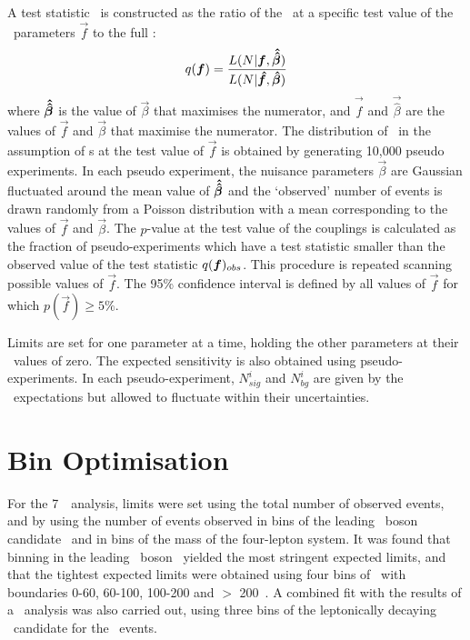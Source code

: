 A test statistic \teststat\ is constructed as the ratio of the \maxprofilellh\
at a specific test value of the \TGC\ parameters $\vec{f}$ to the full \maxprofilellh:
\begin{equation}
q(\boldsymbol{f}) =
\frac{L(N|\boldsymbol{f},\boldsymbol{\hat{\hat{\beta}}})}{L(N|\boldsymbol{\hat{f}},\boldsymbol{\hat{\beta}})}
\end{equation}
where $\boldsymbol{\hat{\hat{\beta}}}$ is the value of $\vec{\beta}$ that maximises the
numerator, and $\vec{\hat{f}}$ and $\vec{\hat{\beta}}$ are the values of
$\vec{f}$ and $\vec{\beta}$ that maximise the numerator. The distribution of
\teststat\ in the assumption of \TGC s at the test value of $\vec{f}$
is obtained by generating 10,000 pseudo experiments. In each
pseudo experiment, the nuisance parameters $\vec{\beta}$ are Gaussian
fluctuated around the mean value of $\boldsymbol{\hat{\hat{\beta}}}$ and the `observed' number of events
is drawn randomly from a Poisson distribution with a mean corresponding to the
values of $\vec{f}$ and $\vec{\beta}$. The $p$-value at the test value of the
couplings is calculated as the fraction of pseudo-experiments which have a test
statistic smaller than the observed value of the test statistic $q(\boldsymbol{f})_{obs}$.
This procedure is repeated scanning possible values of $\vec{f}$. The 95\%
confidence interval is defined by all values of $\vec{f}$ for which
$p(\vec{f})\geq 5\%$. 

Limits are set for one parameter at a time, holding the other parameters at
their \sm\ values of zero. The expected sensitivity is also obtained using
pseudo-experiments. In each pseudo-experiment, $N^{i}_{sig}$ and $N^{i}_{bg}$
are given by the \sm\ expectations but allowed to fluctuate within their
uncertainties.

\section{Bin Optimisation}
\label{sec:TGC-BinOpt}

For the 7~\tev\ analysis, limits were set using the total number of observed
events, and by using the number of events observed in bins of the leading \Z\
boson candidate \pt\ and in bins of the mass of the four-lepton system. It was found that
binning in the leading \Z\ boson \pt\ yielded the most stringent expected limits, and
that the tightest expected limits were obtained using four bins of \pt\ with boundaries 0-60,
60-100, 100-200 and $>$ 200~\GeV. A combined fit with the results of a \ZZllvv\
analysis was also carried out, using three bins of the leptonically decaying \Z\
candidate for the \ZZllvv\ events.

